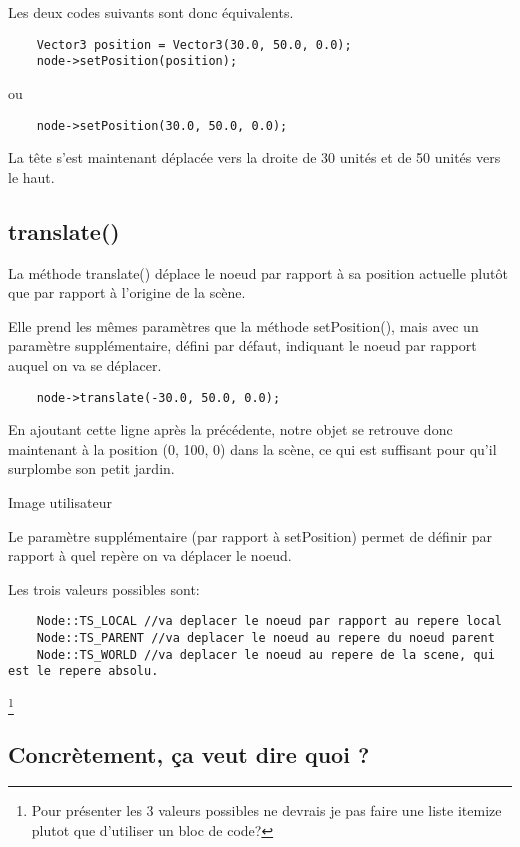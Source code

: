 \documentclass[10pt,a4paper]{report}
\begin{document}
Les deux codes suivants sont donc \'equivalents.
\begin{lstlisting}
	Vector3 position = Vector3(30.0, 50.0, 0.0);
	node->setPosition(position);
\end{lstlisting}

ou
\begin{lstlisting}
	node->setPosition(30.0, 50.0, 0.0);
\end{lstlisting}

La t\^ete s'est maintenant d\'eplac\'ee vers la droite de 30 unit\'es et de 50 unit\'es vers le haut.




\subsection{translate()}

La m\'ethode translate() d\'eplace le noeud par rapport \`{a} sa position actuelle plut\^ot que par rapport \`{a} l'origine de la sc\`ene.

Elle prend les m\^emes param\`etres que la m\'ethode setPosition(), mais avec un param\`etre suppl\'ementaire, d\'efini par d\'efaut, indiquant le noeud par rapport auquel on va se d\'eplacer.
\begin{lstlisting}
	node->translate(-30.0, 50.0, 0.0);
\end{lstlisting}

En ajoutant cette ligne apr\`es la pr\'ec\'edente, notre objet se retrouve donc maintenant \`{a} la position (0, 100, 0) dans la sc\`ene, ce qui est suffisant pour qu'il surplombe son petit jardin.

Image utilisateur

Le param\`etre suppl\'ementaire (par rapport \`{a} setPosition) permet de d\'efinir par rapport \`{a} quel rep\`ere on va d\'eplacer le noeud.

Les trois valeurs possibles sont:
\begin{lstlisting}
    Node::TS_LOCAL //va deplacer le noeud par rapport au repere local
    Node::TS_PARENT //va deplacer le noeud au repere du noeud parent
    Node::TS_WORLD //va deplacer le noeud au repere de la scene, qui est le repere absolu.
\end{lstlisting}\footnote{Pour présenter les 3 valeurs possibles ne devrais je pas faire une liste itemize plutot que d'utiliser un bloc de code?}



\subsection{Concr\`etement, \c{c}a veut dire quoi ?}
\end{document}

